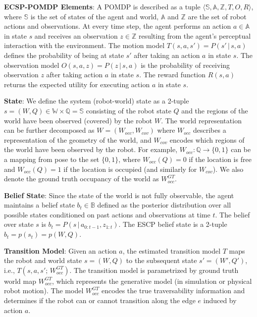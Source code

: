\documentclass{article}
\newcommand{\ph}[1]{{\textbf{#1}:}} %
\begin{document}
\ph{ECSP-POMDP Elements} A POMDP is described as a tuple $\langle \mathbb{S}, \mathbb{A}, \mathbb{Z}, T, O, R \rangle$, where $\mathbb{S}$ is the set of states of the agent and world, $\mathbb{A}$ and $\mathbb{Z}$ are the set of robot actions and observations. At every time step, the agent performs an action $a \in \mathbb{A}$ in state $s$ and receives an observation $z \in \mathbb{Z}$ resulting from the agent's perceptual interaction with the environment. The motion model $T(s, a, s') = P(s'\,|\,s, a)$ defines the probability of being at state $s'$ after taking an action $a$ in state $s$. The observation model $O(s, a, z) = P(z\,|\,s, a)$ is the probability of receiving observation $z$ after taking action $a$ in state $s$. The reward function $R(s,a)$ returns the expected utility for executing action $a$ in state $s$.

\ph{State} We define the system (robot-world) state as a 2-tuple $s = (W, Q) \in \mathbb{W}\times\mathbb{Q} =  \mathbb{S}$ consisting of the robot state $Q$ and the regions of the world have been observed (covered) by the robot $W$. The world representation can be further decomposed as $W = (W_{occ}, W_{cov})$ where $W_{occ}$ describes a representation of the geometry of the world, and $W_{cov}$ encodes which regions of the world have been observed by the robot.  For example, $W_{occ}:\mathbb{Q}\rightarrow\{0,1\}$ can be a mapping from pose to the set $\{0,1\}$, where $W_{occ}(Q) = 0$ if the location is free and $W_{occ}(Q) = 1$ if the location is occupied (and similarly for $W_{cov}$).  We also denote the ground truth occupancy of the world as $W_{occ}^{GT}$.

\ph{Belief State} Since the state of the world is not fully observable, the agent maintains a belief state $b_t\in \mathbb{B}$ defined as the posterior distribution over all possible states conditioned on past actions and observations at time $t$. The belief over state $s$ is $b_{t} = P(s \,|\, a_{0:t-1}, z_{1:t})$. The ESCP belief state is a 2-tuple $b_t = p(s_t) = p(W,Q)$.

\ph{Transition Model} Given an action $a$, the estimated transition model $T$ maps the robot and world state $s = (W, Q)$ to the subsequent state $s' = (W', Q')$, i.e., $T(s, a, s'; \, W_{occ}^{GT})$. 
The transition model is parametrized by ground truth world map $W_{occ}^{GT}$, which represents the generative model (in simulation or physical robot motion). %
The model $W_{occ}^{GT}$ encodes the true traversability information and determines if the robot can or cannot transition along the edge $e$ induced by action $a$.%
\end{document}
